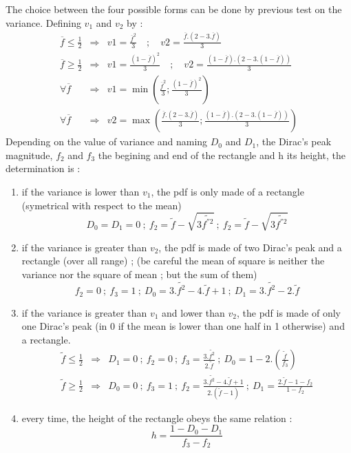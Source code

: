 The choice between the four possible forms can be done by previous test on the
variance. Defining $v_1$ and $v_2$ by :
\begin{eqnarray}
\overline{f} \le \frac{1}{2} &\Rightarrow& v1 = \frac{\overline{f}^2}{3} \quad ; \quad v2 = \frac{\overline{f}.(2-3.\overline{f})}{3}                   \\
\overline{f} \ge \frac{1}{2} &\Rightarrow& v1 = \frac{(1-\overline{f})^2}{3} \quad ; \quad v2 = \frac{(1-\overline{f}).(2-3.(1-\overline{f}))}{3}       \\
\forall \overline{f} &\Rightarrow& v1= \min\left( \frac{\overline{f}^2}{3} ; \frac{(1-\overline{f})^2}{3}\right)                                        \\
\forall \overline{f} &\Rightarrow& v2= \max\left( \frac{\overline{f}.(2-3.\overline{f})}{3} ; \frac{(1-\overline{f}).(2-3.(1-\overline{f}))}{3}\right)
\end{eqnarray}
Depending on the value of variance and naming $D_0$ and $D_1$, the Dirac's peak
magnitude, $f_2$ and $f_3$ the begining and end of the rectangle and h its
height, the determination is :

\begin{enumerate}
\item if the variance is lower than $v_1$, the pdf is only made of a rectangle (symetrical with respect to the mean)
\begin{equation}
D_0 = D_1 = 0 ~;~ f_2 = \tilde{f} - \sqrt{3\widetilde{f^{''2}}} ~;~ f_2 = \tilde{f} - \sqrt{3\widetilde{f^{''2}}}
\end{equation}
\item if the variance is greater than $v_2$, the pdf is made of two Dirac's peak
  and a rectangle (over all range) ; (be careful the mean of square is neither
  the variance nor the square of mean ; but the sum of them)
\begin{equation}
f_2 = 0 ~;~ f_3 = 1 ~;~ D_0 = 3.\widetilde{f^2}-4.\tilde{f}+1 ~;~ D_1 = 3.\widetilde{f^2}-2.\tilde{f}
\end{equation}
\item if the variance is greater than $v_1$ and lower than $v_2$, the pdf is
  made of only one Dirac's peak (in 0 if the mean is lower than one half in 1
  otherwise) and a rectangle.
\begin{eqnarray}
\tilde{f} \le \frac{1}{2} & \Rightarrow & D_1 = 0 ~;~ f_2 = 0 ~;~ f_3 = \frac{3.\widetilde{f^2}}{2.\tilde{f}} ~;~ D_0 = 1-2. \left(\frac{\tilde{f}}{f_3} \right)  \\ 
\tilde{f} \ge \frac{1}{2} & \Rightarrow & D_0 = 0 ~;~ f_3 = 1 ~;~ f_2 = \frac{3.\widetilde{f^2}-4.\tilde{f}+1}{2.(\tilde{f}-1)} ~;~ D_1 = \frac{2.\tilde{f}-1-f_2}{1-f_2} \nonumber
\end{eqnarray}
\item every time, the height of the rectangle obeys the same relation :
\begin{equation}
h = \frac{1-D_0-D_1}{f_3-f_2}
\end{equation} 
\end{enumerate}

